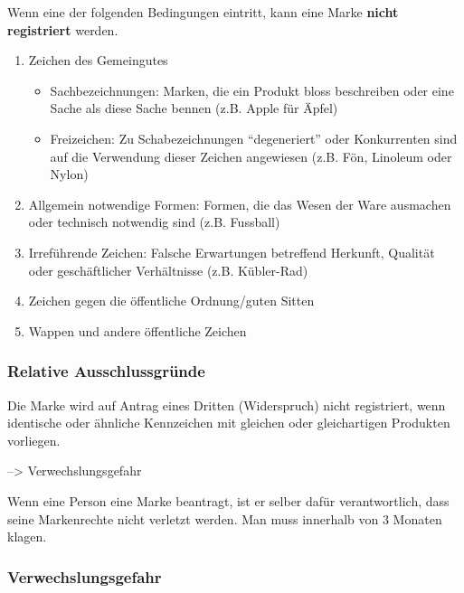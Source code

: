 Wenn eine der folgenden Bedingungen eintritt, kann eine Marke
\textbf{nicht registriert} werden.

\begin{enumerate}
\def\labelenumi{\arabic{enumi}.}
\tightlist
\item
  Zeichen des Gemeingutes

  \begin{itemize}
  \tightlist
  \item
    Sachbezeichnungen: Marken, die ein Produkt bloss beschreiben oder
    eine Sache als diese Sache bennen (z.B. Apple für Äpfel)
  \item
    Freizeichen: Zu Schabezeichnungen ``degeneriert'' oder Konkurrenten
    sind auf die Verwendung dieser Zeichen angewiesen (z.B. Fön,
    Linoleum oder Nylon)
  \end{itemize}
\item
  Allgemein notwendige Formen: Formen, die das Wesen der Ware ausmachen
  oder technisch notwendig sind (z.B. Fussball)
\item
  Irreführende Zeichen: Falsche Erwartungen betreffend Herkunft,
  Qualität oder geschäftlicher Verhältnisse (z.B. Kübler-Rad)
\item
  Zeichen gegen die öffentliche Ordnung/guten Sitten
\item
  Wappen und andere öffentliche Zeichen
\end{enumerate}

\hypertarget{relative-ausschlussgruxfcnde}{%
\subsubsection{Relative
Ausschlussgründe}\label{relative-ausschlussgruxfcnde}}

Die Marke wird auf Antrag eines Dritten (Widerspruch) nicht registriert,
wenn identische oder ähnliche Kennzeichen mit gleichen oder
gleichartigen Produkten vorliegen.

--\textgreater{} Verwechslungsgefahr

Wenn eine Person eine Marke beantragt, ist er selber dafür
verantwortlich, dass seine Markenrechte nicht verletzt werden. Man muss
innerhalb von 3 Monaten klagen.

\hypertarget{verwechslungsgefahr}{%
\subsubsection{Verwechslungsgefahr}\label{verwechslungsgefahr}}

